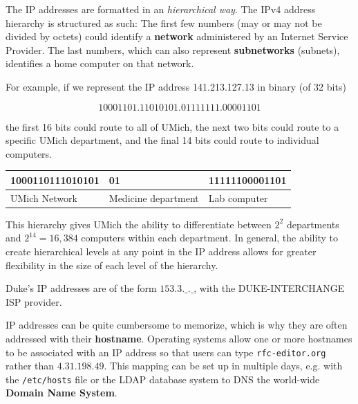 \documentclass{article}
\begin{document}
    \begin{definition} 
      The IP addresses are formatted in an \textit{hierarchical way}. The IPv4 address hierarchy is structured as such: The first few numbers (may or may not be divided by octets) could identify a \textbf{network} administered by an Internet Service Provider. The last numbers, which can also represent \textbf{subnetworks} (subnets), identifies a home computer on that network. 
    \end{definition}

    \begin{example}
      For example, if we represent the IP address 141.213.127.13 in binary (of 32 bits)

        \[10001101.11010101.01111111.00001101\]

      the first 16 bits could route to all of UMich, the next two bits could route to a specific UMich department, and the final 14 bits could route to individual computers. 
      \begin{center}
      \begin{tabular}{l|l|l}
          1000110111010101 & 01 & 11111100001101  \\
          \hline
          UMich Network & Medicine department & Lab computer 
      \end{tabular}
      \end{center}
      This hierarchy gives UMich the ability to differentiate between $2^2$ departments and $2^{14} = 16,384$ computers within each department. In general, the ability to create hierarchical levels at any point in the IP address allows for greater flexibility in the size of each level of the hierarchy. 
    \end{example}
    
    \begin{example}[Duke]
      Duke's IP addresses are of the form $153.3.\_.\_$, with the DUKE-INTERCHANGE ISP provider.  
    \end{example} 

    \begin{definition}[Hostname]
      IP addresses can be quite cumbersome to memorize, which is why they are often addressed with their \textbf{hostname}. Operating systems allow one or more hostnames to be associated with an IP address so that users can type \texttt{rfc-editor.org} rather than $4.31.198.49$. This mapping can be set up  in multiple days, e.g. with the \texttt{/etc/hosts} file or the LDAP database system to DNS the world-wide \textbf{Domain Name System}. 
    \end{definition}
\end{document}
